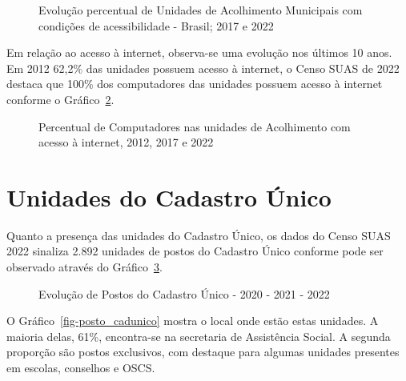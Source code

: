 \documentclass[
  letterpaper,
  DIV=11,
  numbers=noendperiod]{scrreprt}
\begin{document}
\begin{figure}


\caption{\label{fig-unac_acessibilidade}Evolução percentual de Unidades
de Acolhimento Municipais com condições de acessibilidade - Brasil; 2017
e 2022}

\end{figure}%

Em relação ao acesso à internet, observa-se uma evolução nos últimos 10
anos. Em 2012 62,2\% das unidades possuem acesso à internet, o Censo
SUAS de 2022 destaca que 100\% dos computadores das unidades possuem
acesso à internet conforme o Gráfico~\ref{fig-unac-internet}.

\begin{figure}


\caption{\label{fig-unac-internet}Percentual de Computadores nas
unidades de Acolhimento com acesso à internet, 2012, 2017 e 2022}

\end{figure}%

\section{Unidades do Cadastro
Único}\label{unidades-do-cadastro-uxfanico}

Quanto a presença das unidades do Cadastro Único, os dados do Censo SUAS
2022 sinaliza 2.892 unidades de postos do Cadastro Único conforme pode
ser observado através do Gráfico~\ref{fig-postos-cadunico}.

\begin{figure}


\caption{\label{fig-postos-cadunico}Evolução de Postos do Cadastro Único
- 2020 - 2021 - 2022}

\end{figure}%

O Gráfico~\ref{fig-posto_cadunico} mostra o local onde estão estas
unidades. A maioria delas, 61\%, encontra-se na secretaria de
Assistência Social. A segunda proporção são postos exclusivos, com
destaque para algumas unidades presentes em escolas, conselhos e OSCS.
\end{document}
